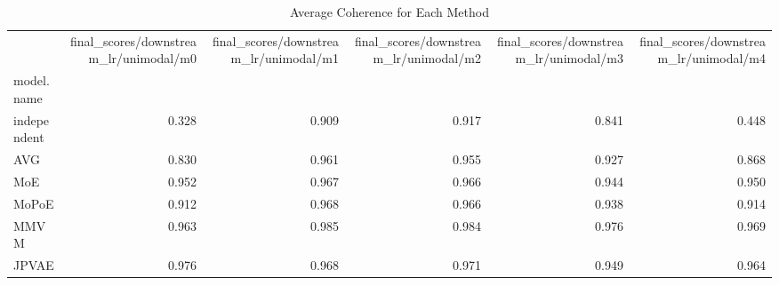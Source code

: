 \begin{table}
\caption{Average Coherence for Each Method}
\label{tab:average_coherence}
\begin{tabular}{lrrrrr}
\toprule
 & final_scores/downstream_lr/unimodal/m0 & final_scores/downstream_lr/unimodal/m1 & final_scores/downstream_lr/unimodal/m2 & final_scores/downstream_lr/unimodal/m3 & final_scores/downstream_lr/unimodal/m4 \\
model.name &  &  &  &  &  \\
\midrule
independent & 0.328 & 0.909 & 0.917 & 0.841 & 0.448 \\
AVG & 0.830 & 0.961 & 0.955 & 0.927 & 0.868 \\
MoE & 0.952 & 0.967 & 0.966 & 0.944 & 0.950 \\
MoPoE & 0.912 & 0.968 & 0.966 & 0.938 & 0.914 \\
MMVM & 0.963 & 0.985 & 0.984 & 0.976 & 0.969 \\
JPVAE & 0.976 & 0.968 & 0.971 & 0.949 & 0.964 \\
\bottomrule
\end{tabular}
\end{table}
